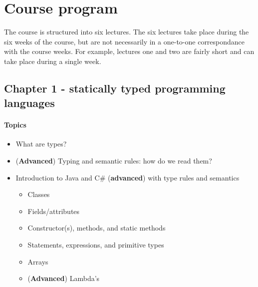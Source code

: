 \section{Course program}
	The course is structured into six lectures. The six lectures take place during the six weeks of the course, but are not necessarily in a one-to-one correspondance with the course weeks. For example, lectures one and two are fairly short and can take place during a single week.

		\subsection{Chapter 1 - statically typed programming languages}
		\paragraph*{Topics}
		\begin{itemize}
			\item What are types?
			\item (\textbf{Advanced}) Typing and semantic rules: how do we read them?
			\item Introduction to Java and C\# (\textbf{advanced}) with type rules and semantics
			\begin{itemize}
				\item Classes
				\item Fields/attributes
				\item Constructor(s), methods, and static methods
				\item Statements, expressions, and primitive types
				\item Arrays
				\item (\textbf{Advanced}) Lambda's
			\end{itemize}
		\end{itemize}
		
